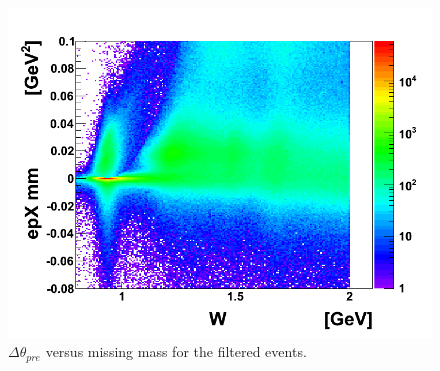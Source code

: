 \begin{landscape}
\begin{figure}[ht]
\centering
\includegraphics[width=1.15\textheight]{img/epXmm2_W_data_no_cut.gif}
\caption{$\Delta\theta_{pre}$ versus missing mass for the filtered events.}
\label{fig:dth2_epXmm2_all_cuts}
\end{figure}
\end{landscape}












